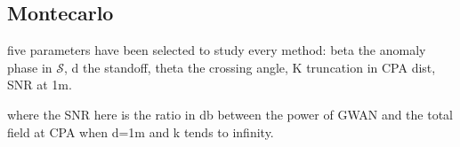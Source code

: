 \subsection{Montecarlo}

five parameters have been selected to study every method: beta the anomaly phase in $\mathcal{S}$, d the standoff, theta the crossing angle, K truncation in CPA dist, SNR at 1m.

where the SNR here is the ratio in db between the power of GWAN and the total field at CPA when d=1m and k tends to infinity.

